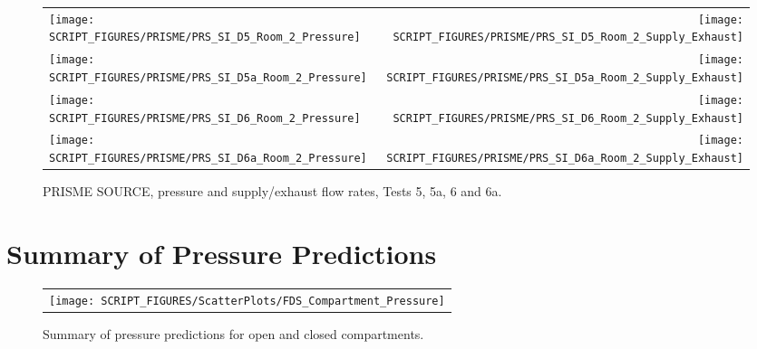 \begin{figure}[p]
\begin{tabular*}{\textwidth}{l@{\extracolsep{\fill}}r}
\texttt{[image: SCRIPT\_FIGURES/PRISME/PRS\_SI\_D5\_Room\_2\_Pressure]} &
\texttt{[image: SCRIPT\_FIGURES/PRISME/PRS\_SI\_D5\_Room\_2\_Supply\_Exhaust]} \\
\texttt{[image: SCRIPT\_FIGURES/PRISME/PRS\_SI\_D5a\_Room\_2\_Pressure]} &
\texttt{[image: SCRIPT\_FIGURES/PRISME/PRS\_SI\_D5a\_Room\_2\_Supply\_Exhaust]} \\
\texttt{[image: SCRIPT\_FIGURES/PRISME/PRS\_SI\_D6\_Room\_2\_Pressure]} &
\texttt{[image: SCRIPT\_FIGURES/PRISME/PRS\_SI\_D6\_Room\_2\_Supply\_Exhaust]} \\
\texttt{[image: SCRIPT\_FIGURES/PRISME/PRS\_SI\_D6a\_Room\_2\_Pressure]} &
\texttt{[image: SCRIPT\_FIGURES/PRISME/PRS\_SI\_D6a\_Room\_2\_Supply\_Exhaust]}
\end{tabular*}
\caption{PRISME SOURCE, pressure and supply/exhaust flow rates, Tests 5, 5a, 6 and 6a.}
\label{PRISME_SOURCE_Room_2_Pressure_2}
\end{figure}



\clearpage

\section{Summary of Pressure Predictions}
\label{Compartment Over-Pressure}

\begin{figure}[h!]
\begin{center}
\begin{tabular}{c}
\texttt{[image: SCRIPT\_FIGURES/ScatterPlots/FDS\_Compartment\_Pressure]}
\end{tabular}
\end{center}
\caption[Summary of pressure predictions]{Summary of pressure predictions for open and closed compartments.}
\label{Pressure_Summary}
\end{figure}

